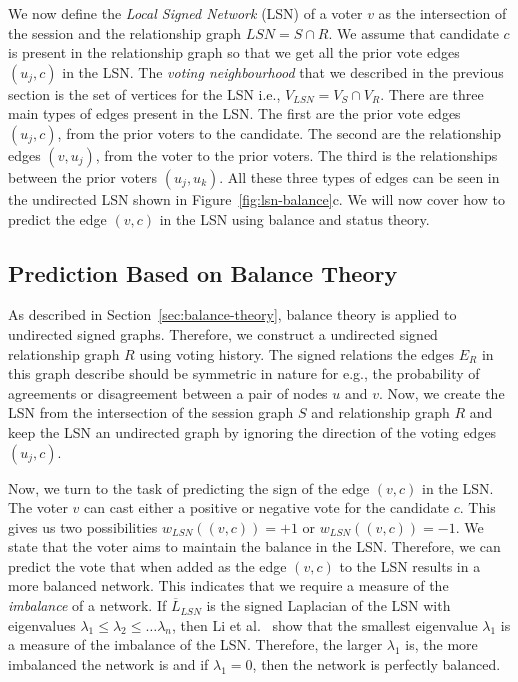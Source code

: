 We now define the \textit{Local Signed Network} (LSN) of a voter $v$ as the intersection of the session and the relationship graph $LSN=S \cap R$.
We assume that candidate $c$ is present in the relationship graph so that we get all the prior vote edges $(u_j,c)$ in the LSN.
The \textit{voting neighbourhood} that we described in the previous section is the set of vertices for the LSN i.e., $V_{LSN}=V_S \cap V_R$.
There are three main types of edges present in the LSN.
The first are the prior vote edges $(u_j,c)$, from the prior voters to the candidate.
The second are the relationship edges $(v,u_j)$, from the voter to the prior voters.
The third is the relationships between the prior voters $(u_j,u_k)$.
All these three types of edges can be seen in the undirected LSN shown in Figure~\ref{fig:lsn-balance}c.
We will now cover how to predict the edge $(v,c)$ in the LSN using balance and status theory.  

\subsection{Prediction Based on Balance Theory}
\label{subsec:prediction-based-balance}
As described in Section~\ref{sec:balance-theory}, balance theory is applied to undirected signed graphs.
Therefore, we construct a undirected signed relationship graph $R$ using voting history.
The signed relations the edges $E_R$ in this graph describe should be symmetric in nature for e.g., the probability of agreements or disagreement between a pair of nodes $u$ and $v$.
Now, we create the LSN from the intersection of the session graph $S$ and relationship graph $R$ and keep the LSN an undirected graph by ignoring the direction of the voting edges $(u_j,c)$. 

Now, we turn to the task of predicting the sign of the edge $(v,c)$ in the LSN.
The voter $v$ can cast either a positive or negative vote for the candidate $c$.
This gives us two possibilities $w_{LSN}((v,c))=+1$ or $w_{LSN}((v,c))=-1$.
We state that the voter aims to maintain the balance in the LSN.
Therefore, we can predict the vote that when added as the edge $(v,c)$ to the LSN results in a more balanced network.
This indicates that we require a measure of the \textit{imbalance} of a network.
If $\overline{L}_{LSN}$ is the signed Laplacian of the LSN with eigenvalues $\lambda_1\leq\lambda_2\leq\dots\lambda_n$, then Li et al.\ \cite{li2016note} show that the smallest eigenvalue $\lambda_1$ is a measure of the imbalance of the LSN.
Therefore, the larger $\lambda_1$ is, the more imbalanced the network is and if $\lambda_1=0$, then the network is perfectly balanced. 
 
